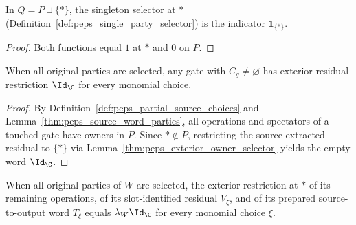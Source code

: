 \begin{lemma}
    \label{thm:peps_exterior_owner_selector}
    \leanok
    In $Q=P\sqcup\{*\}$, the singleton selector at $*$ (Definition~\ref{def:peps_single_party_selector})
    is the indicator $\mathbf 1_{\{*\}}$.
\end{lemma}

\begin{proof}\leanok
    Both functions equal $1$ at $*$ and $0$ on $P$.
\end{proof}

\begin{lemma}
    \label{thm:peps_actual_touched_gate_exterior}
    \leanok
    When all original parties are selected, any gate with $C_g\neq\varnothing$
    has exterior residual restriction $\Id_{\C}$ for every monomial choice.
\end{lemma}

\begin{proof}
    \leanok
    By Definition~\ref{def:peps_partial_source_choices} and
    Lemma~\ref{thm:peps_source_word_parties}, all operations and spectators of
    a touched gate have owners in $P$. Since $*\notin P$, restricting the
    source-extracted residual to $\{*\}$ via
    Lemma~\ref{thm:peps_exterior_owner_selector} yields the empty word
    $\Id_{\C}$.
\end{proof}

\begin{lemma}
    \label{thm:peps_actual_chronological_exterior_scalar}
    \leanok
    When all original parties of $W$ are selected, the exterior restriction at
    $*$ of its remaining operations, of its slot-identified residual
    $V_\xi$, and of its prepared source-to-output word $T_\xi$ equals
    $\lambda_W\Id_{\C}$ for every monomial choice $\xi$.
\end{lemma}

